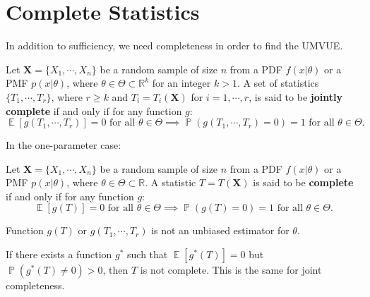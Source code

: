 \documentclass{huhtakm-template-book-v2}
\DeclareMathOperator{\prob}{\mathbb{P}}
\DeclareMathOperator{\E}{\mathbb{E}}
\begin{document}
\section{Complete Statistics}
    In addition to sufficiency, we need completeness in order to find the UMVUE.
    \begin{defn}
        Let $\mathbf{X}=\{X_{1},\cdots,X_{n}\}$ be a random sample of size $n$ from a PDF $f(x|\theta)$ or a PMF $p(x|\theta)$, where $\theta\in\Theta\subset\mathbb{R}^{k}$ for an integer $k>1$. A set of statistics $\{T_{1},\cdots,T_{r}\}$, where $r\geq k$ and $T_{i}=T_{i}(\mathbf{X})$ for $i=1,\cdots,r$, is said to be \textbf{jointly complete} if and only if for any function $g$:
        \begin{equation*}
            \E[g(T_{1},\cdots,T_{r})]=0\text{ for all }\theta\in\Theta\implies\prob(g(T_{1},\cdots,T_{r})=0)=1\text{ for all }\theta\in\Theta.
        \end{equation*}
    \end{defn}
    In the one-parameter case:
    \begin{defn}
        Let $\mathbf{X}=\{X_{1},\cdots,X_{n}\}$ be a random sample of size $n$ from a PDF $f(x|\theta)$ or a PMF $p(x|\theta)$, where $\theta\in\Theta\subset\mathbb{R}$. A statistic $T=T(\mathbf{X})$ is said to be \textbf{complete} if and only if for any function $g$:
        \begin{equation*}
            \E[g(T)]=0\text{ for all }\theta\in\Theta\implies\prob(g(T)=0)=1\text{ for all }\theta\in\Theta.
        \end{equation*} 
    \end{defn}
    \begin{rem}
        Function $g(T)$ or $g(T_{1},\cdots,T_{r})$ is not an unbiased estimator for $\theta$.
    \end{rem}
    \begin{rem}
        If there exists a function $g^{*}$ such that $\E[g^{*}(T)]=0$ but $\prob(g^{*}(T)\neq 0)>0$, then $T$ is not complete. This is the same for joint completeness. 
    \end{rem}
    \newpage
    
\end{document}
